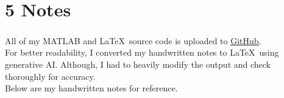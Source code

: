 \documentclass[12pt]{article}
\newcommand{\ghlink}[2]{\href{#1}{\color{blue}\uline{#2}}}
\begin{document}
\section*{5 \quad Notes}
\label{sec:notes}

All of my MATLAB\textsuperscript{\textregistered} and \LaTeX \ source code is uploaded to \ghlink{https://github.com/ShantonuM/wes265_sp2026/tree/main/hw1}{GitHub}.\\[10pt]
For better readability, I converted my handwritten notes to  \LaTeX \ using generative AI. Although, I had to heavily modify the output and check thoroughly for accuracy.\\[10pt]
Below are my handwritten notes for reference.




\end{document}
